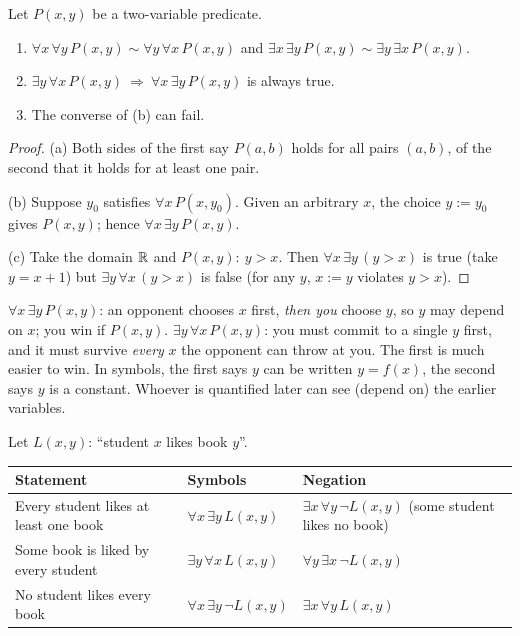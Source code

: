\begin{theorem}\label{thm:order}
	Let $P(x,y)$ be a two-variable predicate.
	\begin{enumerate}[label=(\alph*)]
		\item $\forall x\,\forall y\,P(x,y)\sim\forall y\,\forall x\,P(x,y)$ and $\exists x\,\exists y\,P(x,y)\sim\exists y\,\exists x\,P(x,y)$.
		\item $\exists y\,\forall x\,P(x,y)\ \Rightarrow\ \forall x\,\exists y\,P(x,y)$ is always true.
		\item The converse of (b) can fail.
	\end{enumerate}
\end{theorem}
\begin{proof}
	(a) Both sides of the first say $P(a,b)$ holds for all pairs $(a,b)$, of the second that it holds for at least one pair.
	
	(b) Suppose $y_0$ satisfies $\forall x\,P(x,y_0)$. Given an arbitrary $x$, the choice $y:=y_0$ gives $P(x,y)$; hence $\forall x\,\exists y\,P(x,y)$.
	
	(c) Take the domain $\mathbb{R}$ and $P(x,y):\ y>x$. Then $\forall x\,\exists y\,(y>x)$ is true (take $y=x+1$) but $\exists y\,\forall x\,(y>x)$ is false (for any $y$, $x:=y$ violates $y>x$).
\end{proof}

\begin{intuition}
	$\forall x\,\exists y\,P(x,y)$: an opponent chooses $x$ first, \emph{then you} choose $y$, so $y$ may depend on $x$; you win if $P(x,y)$. $\exists y\,\forall x\,P(x,y)$: you must commit to a single $y$ first, and it must survive \emph{every} $x$ the opponent can throw at you. The first is much easier to win. In symbols, the first says $y$ can be written $y=f(x)$, the second says $y$ is a constant. Whoever is quantified later can see (depend on) the earlier variables.
\end{intuition}

\begin{example}[Likes]
	Let $L(x,y)$: ``student $x$ likes book $y$''.
	\begin{center}
		\begin{tabular}{@{}p{5.3cm}p{4.2cm}p{5cm}@{}}
			\toprule
			\textbf{Statement} & \textbf{Symbols} & \textbf{Negation}\\
			\midrule
			Every student likes at least one book & $\forall x\,\exists y\,L(x,y)$ & $\exists x\,\forall y\,\neg L(x,y)$ (some student likes no book)\\
			Some book is liked by every student & $\exists y\,\forall x\,L(x,y)$ & $\forall y\,\exists x\,\neg L(x,y)$\\
			No student likes every book & $\forall x\,\exists y\,\neg L(x,y)$ & $\exists x\,\forall y\,L(x,y)$\\
			\bottomrule
		\end{tabular}
	\end{center}
\end{example}


